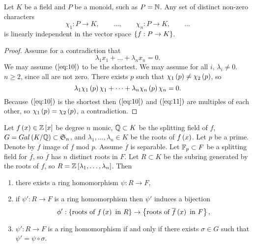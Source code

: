 \begin{theorem}
Let $ K $ be a field and $ P $ be a monoid, such as $ P = \mathbb{N} $. Any set of distinct non-zero characters
$$ \chi_1 : P \to K, \qquad \dots, \qquad \chi_n : P \to K, \qquad \dots $$
is linearly independent in the vector space $ \left\{ f : P \to K \right\} $.
\end{theorem}

\begin{proof}
Assume for a contradiction that
\begin{equation}
\label{eq:10}
\lambda_1x_1 + \dots + \lambda_nx_n = 0.
\end{equation}
We may assume $ \left( \ref{eq:10} \right) $ to be the shortest. We may assume for all $ i $, $ \lambda_i \ne 0 $. $ n \ge 2 $, since all are not zero. There exists $ p $ such that $ \chi_1\left( p \right) \ne \chi_2\left( p \right) $, so
\begin{equation}
\label{eq:11}
\lambda_1\chi_1\left( p \right)\chi_1 + \dots + \lambda_n\chi_n\left( p \right)\chi_n = 0.
\end{equation}
Because $ \left( \ref{eq:10} \right) $ is the shortest then $ \left( \ref{eq:10} \right) $ and $ \left( \ref{eq:11} \right) $ are multiples of each other, so $ \chi_1\left( p \right) = \chi_2\left( p \right) $, a contradiction.
\end{proof}

\begin{theorem}
\label{thm:ringhomomorphism}
Let $ f\left( x \right) \in \mathbb{Z}\left[ x \right] $ be degree $ n $ monic, $ \mathbb{Q} \subset K $ be the splitting field of $ f $, $ G = Gal\left( K / \mathbb{Q} \right) \subset \mathfrak{S}_n $, and $ \lambda_1, \dots, \lambda_n \in K $ be the roots of $ f\left( x \right) $. Let $ p $ be a prime. Denote by $ \overline{f} $ image of $ f $ mod $ p $. Assume $ \overline{f} $ is separable. Let $ \mathbb{F}_p \subset F $ be a splitting field for $ \overline{f} $, so $ \overline{f} $ has $ n $ distinct roots in $ F $. Let $ R \subset K $ be the subring generated by the roots of $ f $, so $ R = \mathbb{Z}\left[ \lambda_1, \dots, \lambda_n \right] $. Then
\begin{enumerate}
\item there exists a ring homomorphism $ \psi : R \to F $,
\item if $ \psi' : R \to F $ is a ring homomorphism then $ \psi' $ induces a bijection
$$ \phi' : \cb{\text{roots of} \ f\rb{x} \ \text{in} \ R} \to \cb{\text{roots of} \ \overline{f}\rb{x} \ \text{in} \ F}, $$
\item $ \psi' : R \to F $ is a ring homomorphism if and only if there exists $ \sigma \in G $ such that $ \psi' = \psi \circ \sigma $.
\end{enumerate}
\end{theorem}

